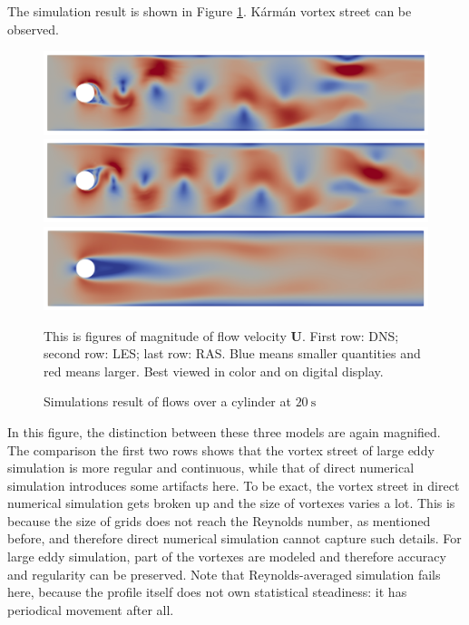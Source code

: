 \documentclass[english, nochinese]{pkupaper}
\begin{document}
The simulation result is shown in Figure \ref{Fig:Cyl}. K\'arm\'an vortex street can be observed.

\begin{figure}[htbp]
{
\centering
{
\includegraphics[width=15cm]{Results/Figure03a.pdf}
\includegraphics[width=15cm]{Results/Figure03b.pdf}
\includegraphics[width=15cm]{Results/Figure03c.pdf}
}
\caption{Simulations result of flows over a cylinder at $\SI{20}{\second}$}
\label{Fig:Cyl}
}
{
\footnotesize
This is figures of magnitude of flow velocity $\mathbf{U}$. First row: DNS; second row: LES; last row: RAS. Blue means smaller quantities and red means larger. Best viewed in color and on digital display.
}
\end{figure}

In this figure, the distinction between these three models are again magnified. The comparison the first two rows shows that the vortex street of large eddy simulation is more regular and continuous, while that of direct numerical simulation introduces some artifacts here. To be exact, the vortex street in direct numerical simulation gets broken up and the size of vortexes varies a lot. This is because the size of grids does not reach the Reynolds number, as mentioned before, and therefore direct numerical simulation cannot capture such details. For large eddy simulation, part of the vortexes are modeled and therefore accuracy and regularity can be preserved. Note that Reynolds-averaged simulation fails here, because the profile itself does not own statistical steadiness: it has periodical movement after all.
\end{document}
